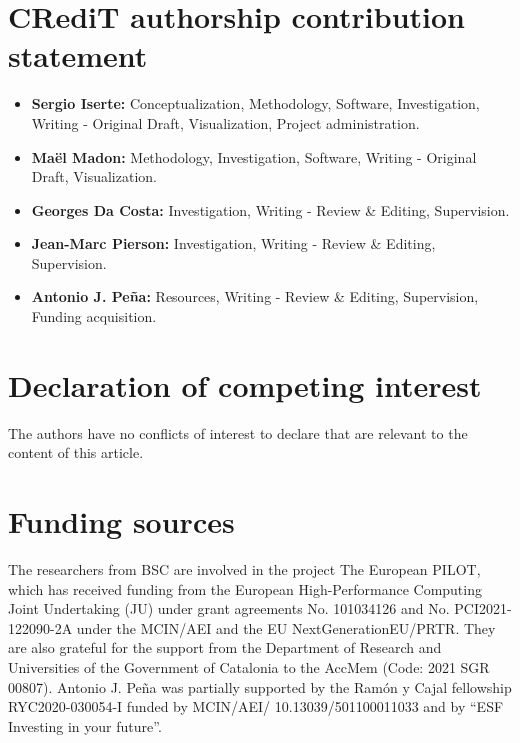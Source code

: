 \documentclass[a4paper,fleqn]{cas-dc}
\begin{document}
\section*{CRediT authorship contribution statement}
\begin{itemize}
    \item \textbf{Sergio Iserte:} Conceptualization, Methodology, Software, Investigation, Writing - Original Draft, Visualization, Project administration.
    \item \textbf{Maël Madon:}  Methodology, Investigation, Software, Writing - Original Draft, Visualization.
    \item \textbf{Georges Da Costa:} Investigation, Writing - Review \& Editing, Supervision.
    \item \textbf{Jean-Marc Pierson:} Investigation, Writing - Review \& Editing, Supervision.
    \item \textbf{Antonio J. Peña:} Resources, Writing - Review \& Editing, Supervision, Funding acquisition.
\end{itemize}

\section*{Declaration of competing interest}
The authors have no conflicts of interest to declare that are relevant to the content of this article.

\section*{Funding sources}
The researchers from BSC are involved in the project The European PILOT, which has received funding from the European High-Performance Computing Joint Undertaking (JU) under grant agreements No. 101034126 and No. PCI2021-122090-2A under the MCIN/AEI and the EU NextGenerationEU/PRTR.
They are also grateful for the support from the Department of Research and Universities of the Government of Catalonia to the AccMem (Code: 2021 SGR 00807).
Antonio J. Peña was partially supported by the Ramón y Cajal fellowship RYC2020-030054-I funded by MCIN/AEI/ 10.13039/501100011033 and by ``ESF Investing in your future''.
\end{document}

